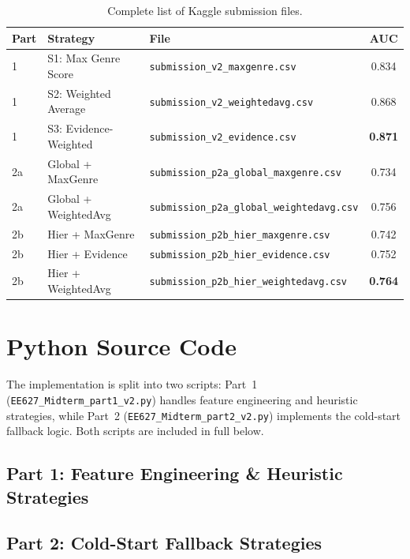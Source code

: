 \documentclass[12pt]{article}
\begin{document}
\begin{table}[H]
	\centering
	\footnotesize
	\begin{tabular}{lllc}
		\toprule
		\textbf{Part} & \textbf{Strategy} & \textbf{File} & \textbf{AUC} \\
		\midrule
		1  & S1: Max Genre Score     & \texttt{submission\_v2\_maxgenre.csv}     & 0.834 \\
		1  & S2: Weighted Average    & \texttt{submission\_v2\_weightedavg.csv}  & 0.868 \\
		1  & S3: Evidence-Weighted   & \texttt{submission\_v2\_evidence.csv}     & \textbf{0.871} \\
		\midrule
		2a & Global + MaxGenre       & \texttt{submission\_p2a\_global\_maxgenre.csv}      & 0.734 \\
		2a & Global + WeightedAvg    & \texttt{submission\_p2a\_global\_weightedavg.csv}   & 0.756 \\
		\midrule
		2b & Hier + MaxGenre         & \texttt{submission\_p2b\_hier\_maxgenre.csv}        & 0.742 \\
		2b & Hier + Evidence         & \texttt{submission\_p2b\_hier\_evidence.csv}        & 0.752 \\
		2b & Hier + WeightedAvg      & \texttt{submission\_p2b\_hier\_weightedavg.csv}     & \textbf{0.764} \\
		\bottomrule
	\end{tabular}
	\caption{Complete list of Kaggle submission files.}\label{tab:all-subs}
\end{table}

\newpage
\appendix
\section{Python Source Code}\label{app:code}

The implementation is split into two scripts: Part~1 (\texttt{EE627\_Midterm\_part1\_v2.py}) handles feature engineering and heuristic strategies, while Part~2 (\texttt{EE627\_Midterm\_part2\_v2.py}) implements the cold-start fallback logic. Both scripts are included in full below.

\subsection{Part 1: Feature Engineering \& Heuristic Strategies}



\newpage
\subsection{Part 2: Cold-Start Fallback Strategies}


\end{document}
